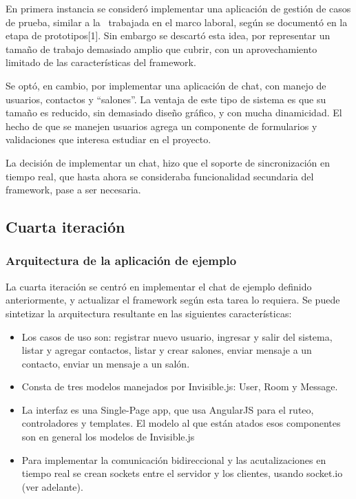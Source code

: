 \documentclass[doc,helv,longtable]{article}
\begin{document}
En primera instancia se consideró implementar una aplicación de gestión de casos de prueba, similar a la  trabajada en el marco laboral, según se documentó en la etapa de prototipos[1]. Sin embargo se descartó esta idea, por representar un tamaño de trabajo demasiado amplio que cubrir, con un aprovechamiento limitado de las características del framework.

Se optó, en cambio, por implementar una aplicación de chat, con manejo de usuarios, contactos y “salones”. La ventaja de este tipo de sistema es que su tamaño es reducido, sin demasiado diseño gráfico, y con mucha dinamicidad. El hecho de que se manejen usuarios agrega un componente de formularios y validaciones que interesa estudiar en el proyecto.

La decisión de implementar un chat, hizo que el soporte de sincronización en tiempo real, que hasta ahora se consideraba funcionalidad secundaria del framework, pase a ser necesaria.\subsection{Cuarta iteración}
\subsubsection{Arquitectura de la aplicación de ejemplo}


La cuarta iteración se centró en implementar el chat de ejemplo definido anteriormente, y actualizar el framework según esta tarea lo requiera. Se puede sintetizar la arquitectura resultante en las siguientes características:
\begin{itemize}
\item  Los casos de uso son: registrar nuevo usuario, ingresar y salir del sistema, listar y agregar contactos, listar y crear salones, enviar mensaje a un contacto, enviar un mensaje a un salón.
\item  Consta de tres modelos manejados por Invisible.js: User, Room y Message.
\item  La interfaz es una Single-Page app, que usa AngularJS para el ruteo, controladores y templates. El modelo al que están atados esos componentes son en general los modelos de Invisible.js
\item  Para implementar la comunicación bidireccional y las acutalizaciones en tiempo real se crean sockets entre el servidor y los clientes, usando socket.io (ver adelante).

\end{itemize}
\end{document}

